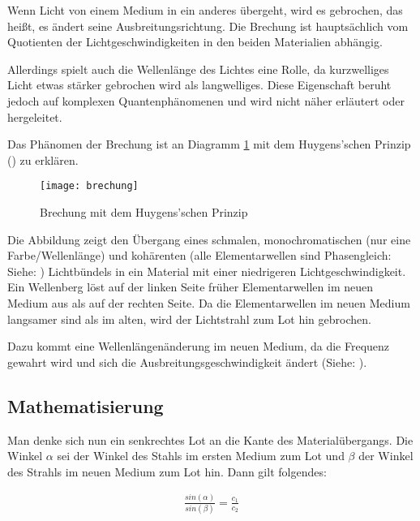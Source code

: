 Wenn Licht von einem Medium in ein anderes übergeht, wird es gebrochen, das heißt, es ändert seine Ausbreitungsrichtung. Die Brechung ist hauptsächlich vom Quotienten der Lichtgeschwindigkeiten in den beiden Materialien abhängig.

Allerdings spielt auch die Wellenlänge des Lichtes eine Rolle, da kurzwelliges Licht etwas stärker gebrochen wird als langwelliges. Diese Eigenschaft beruht jedoch auf komplexen Quantenphänomenen und wird nicht näher erläutert oder hergeleitet.

Das Phänomen der Brechung ist an Diagramm \ref{fig:brechung} mit dem Huygens'schen Prinzip () zu erklären.

\begin{figure}[!h]
	\center
	\texttt{[image: brechung]}
	\caption{Brechung mit dem Huygens'schen Prinzip}
	\label{fig:brechung}
\end{figure}

Die Abbildung zeigt den Übergang eines schmalen, monochromatischen (nur eine Farbe/Wellenlänge) und kohärenten (alle Elementarwellen sind Phasengleich: Siehe: ) Lichtbündels in ein Material mit einer niedrigeren Lichtgeschwindigkeit. Ein Wellenberg löst auf der linken Seite früher Elementarwellen im neuen Medium aus als auf der rechten Seite. Da die Elementarwellen im neuen Medium langsamer sind als im alten, wird der Lichtstrahl zum Lot hin gebrochen.

Dazu kommt eine Wellenlängenänderung im neuen Medium, da die Frequenz gewahrt wird und sich die Ausbreitungsgeschwindigkeit ändert (Siehe: ).

\subsection{Mathematisierung}

Man denke sich nun ein senkrechtes Lot an die Kante des Materialübergangs. Die Winkel $\alpha$ sei der Winkel des Stahls im ersten Medium zum Lot und $\beta$ der Winkel des Strahls im neuen Medium zum Lot hin. Dann gilt folgendes:
	
	\begin{align}
		\frac{sin{(\alpha)}}{sin{(\beta)}} = \frac{c_1}{c_2}
	\end{align}
	
